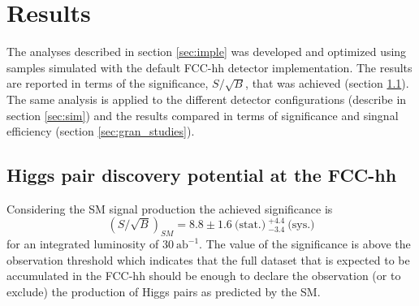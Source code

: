 
\section{Results}
\label{sec:resul}


The analyses described in section \ref{sec:imple} was developed and optimized using samples simulated with the default FCC-hh detector implementation. The results are reported in terms of the significance, $S/\sqrt{B}$, that was achieved (section \ref{sec:results_FCC}). The same analysis is applied to the different detector configurations (describe in section \ref{sec:sim}) and the results compared in terms of significance and singnal efficiency (section \ref{sec:gran_studies}).  

\subsection{Higgs pair discovery potential at the FCC-hh}
\label{sec:results_FCC}

Considering the SM signal production the achieved significance is
\begin{equation}
	(S/\sqrt{B})_{SM}=8.8\pm 1.6~\text{(stat.)}~^{+4.4}_{-3.4}~\text{(sys.)}
\end{equation}
for an integrated luminosity of $30~\text{ab}^{-1}$. The value of the significance is above the observation threshold which indicates that the full dataset that is expected to be accumulated in the FCC-hh should be enough to declare the observation (or to exclude) the production of Higgs pairs as predicted by the SM.

